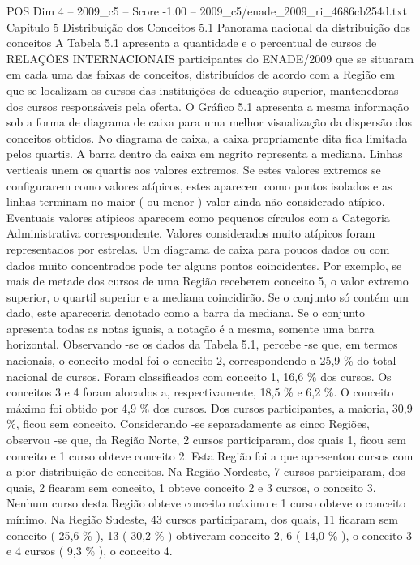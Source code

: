 \begin{textsample}{POS Dim 4 – 2009\_c5 – Score -1.00 – 2009\_c5/enade\_2009\_ri\_4686cb254d.txt}  \label{ex:f4_pos_265}
Capítulo 5 Distribuição dos Conceitos 5.1 Panorama nacional da distribuição dos conceitos A Tabela 5.1 apresenta a quantidade e o percentual de cursos de RELAÇÕES INTERNACIONAIS participantes do ENADE/2009 que se situaram em cada uma das faixas de conceitos, distribuídos de acordo com a Região em que se localizam os cursos das instituições de educação superior, mantenedoras dos cursos responsáveis pela oferta.
O Gráfico 5.1 apresenta a mesma informação sob a forma de diagrama de caixa para uma melhor visualização da dispersão dos conceitos obtidos.
No diagrama de caixa, a caixa propriamente dita fica limitada pelos quartis.
A barra dentro da caixa em negrito representa a mediana.
Linhas verticais unem os quartis aos valores extremos.
Se estes valores extremos se configurarem como valores atípicos, estes aparecem como pontos isolados e as linhas terminam no maior ( ou menor ) valor ainda não considerado atípico.
Eventuais valores atípicos aparecem como pequenos círculos com a Categoria Administrativa correspondente.
Valores considerados muito atípicos foram representados por estrelas.
Um diagrama de caixa para poucos dados ou com dados muito concentrados pode ter alguns pontos coincidentes.
Por exemplo, se mais de metade dos cursos de uma Região receberem conceito 5, o valor extremo superior, o quartil superior e a mediana coincidirão.
Se o conjunto só contém um dado, este apareceria denotado como a barra da mediana.
Se o conjunto apresenta todas as notas iguais, a notação é a mesma, somente uma barra horizontal.
Observando -se os dados da Tabela 5.1, percebe -se que, em termos nacionais, o conceito modal foi o conceito 2, correspondendo a 25,9 \% do total nacional de cursos.
Foram classificados com conceito 1, 16,6 \% dos cursos.
Os conceitos 3 e 4 foram alocados a, respectivamente, 18,5 \% e 6,2 \%.
O conceito máximo foi obtido por 4,9 \% dos cursos.
Dos cursos participantes, a maioria, 30,9 \%, ficou sem conceito.
Considerando -se separadamente as cinco Regiões, observou -se que, da Região Norte, 2 cursos participaram, dos quais 1, ficou sem conceito e 1 curso obteve conceito 2.
Esta Região foi a que apresentou cursos com a pior distribuição de conceitos.
Na Região Nordeste, 7 cursos participaram, dos quais, 2 ficaram sem conceito, 1 obteve conceito 2 e 3 cursos, o conceito 3.
Nenhum curso desta Região obteve conceito máximo e 1 curso obteve o conceito mínimo.
Na Região Sudeste, 43 cursos participaram, dos quais, 11 ficaram sem conceito ( 25,6 \% ), 13 ( 30,2 \% ) obtiveram conceito 2, 6 ( 14,0 \% ), o conceito 3 e 4 cursos ( 9,3 \% ), o conceito 4.

\end{textsample}
